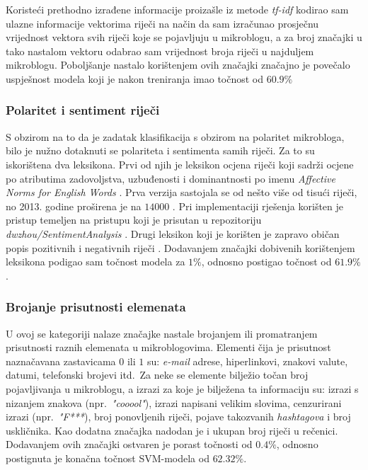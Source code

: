 \documentclass[times, utf8, zavrsni]{fer}
\begin{document}
Koristeći prethodno izrađene informacije proizašle iz metode \emph{tf-idf} kodirao sam ulazne informacije vektorima riječi na način da sam izračunao prosječnu vrijednost vektora svih riječi koje se pojavljuju u mikroblogu, a za broj značajki u tako nastalom vektoru odabrao sam vrijednost broja riječi u najduljem mikroblogu. Poboljšanje nastalo korištenjem ovih značajki značajno je povečalo uspješnost modela koji je nakon treniranja imao točnost od $60.9\%$

\subsubsection{Polaritet i sentiment riječi}

S obzirom na to da je zadatak klasifikacija s obzirom na polaritet mikrobloga, bilo je nužno dotaknuti se polariteta i sentimenta samih riječi. Za to su iskorištena dva leksikona. Prvi od njih je leksikon ocjena riječi koji sadrži ocjene po atributima zadovoljstva, uzbuđenosti i dominantnosti po imenu  \emph{Affective Norms for English Words} \citep{anew}. Prva verzija sastojala se od nešto više od tisući riječi, no 2013. godine proširena je na $14000$ \citep{anew2}. Pri implementaciji rješenja korišten je pristup temeljen na pristupu koji je prisutan u repozitoriju \emph{dwzhou/SentimentAnalysis} \citep{anew_code}. Drugi leksikon koji je korišten je zapravo običan popis pozitivnih i negativnih riječi \citep{leksikon}. 
\noindent Dodavanjem značajki dobivenih korištenjem leksikona podigao sam točnost modela za $1\%$, odnosno postigao točnost od $61.9\%$.

\subsubsection{Brojanje prisutnosti elemenata}

U ovoj se kategoriji nalaze značajke nastale brojanjem ili promatranjem prisutnosti raznih elemenata u mikroblogovima. Elementi čija je prisutnost naznačavana zastavicama $0$ ili $1$ su: \emph{e-mail} adrese, hiperlinkovi, znakovi valute, datumi, telefonski brojevi itd.~Za neke se elemente bilježio točan broj pojavljivanja u mikroblogu, a izrazi za koje je bilježena ta informaciju su: izrazi s nizanjem znakova (npr.~\emph{"cooool"}), izrazi napisani velikim slovima, cenzurirani izrazi (npr.~\emph{"F***}), broj ponovljenih riječi, pojave takozvanih \emph{hashtagova} i broj uskličnika. Kao dodatna značajka nadodan je i ukupan broj riječi u rečenici.
\noindent Dodavanjem ovih značajki ostvaren je porast točnosti od $0.4\%$, odnosno postignuta je konačna točnost \gls{SVM}-modela od $62.32\%$.
\end{document}
